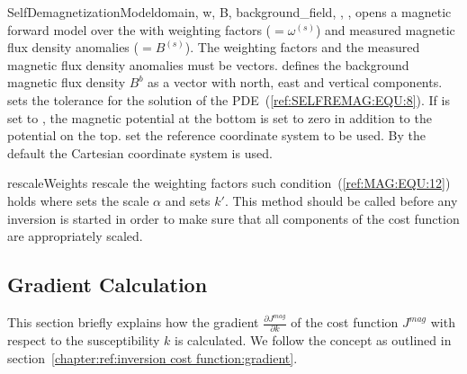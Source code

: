\begin{classdesc}{SelfDemagnetizationModel}{domain, w, B, background_field,
        ,
        ,
}
opens a magnetic forward model over the \Domain {} with 
weighting factors  ($=\omega^{(s)}$) and measured magnetic flux
density anomalies  ($=B^{(s)}$).
The weighting factors and the  measured magnetic flux density anomalies must be vectors.
 defines the background magnetic flux density $B^b$
as a vector with north, east and vertical components. 
 sets the tolerance for the solution of the PDE~(\ref{ref:SELFREMAG:EQU:8}).
If  is set to  \True, the magnetic potential 
at the bottom is set to zero in addition to the potential on the top. 
 set the reference coordinate system to be used. By the default the 
Cartesian coordinate system is used.
\end{classdesc}

\begin{methoddesc}[SelfDemagnetizationModel]{rescaleWeights}{
 }
rescale the weighting factors such condition~(\ref{ref:MAG:EQU:12}) holds where 
 sets the scale $\alpha$
and  sets $k'$. This method should be called before any inversion is started
in order to make sure that all components of the cost function are appropriately scaled.
\end{methoddesc}



\subsection{Gradient Calculation}
This section briefly explains how the gradient
$\frac{\partial J^{mag}}{\partial k}$ of the cost function $J^{mag}$ with
respect to the susceptibility $k$ is calculated.  We follow the concept as outlined in section~\ref{chapter:ref:inversion cost function:gradient}.

